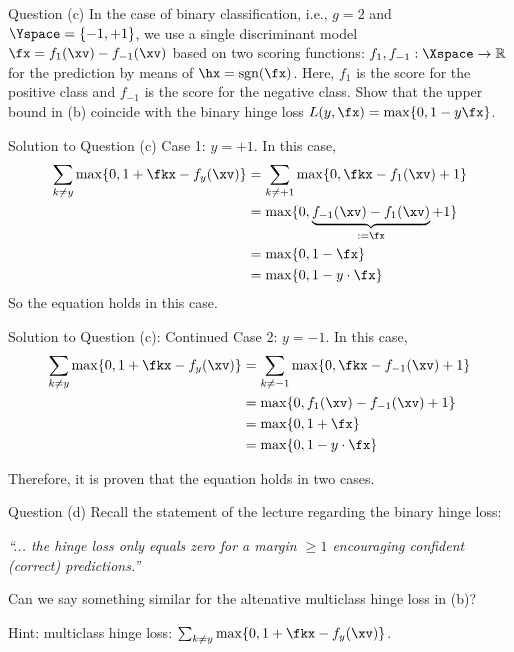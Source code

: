 \documentclass[aspectratio=169]{beamer}
\newcommand{\fyx}{f_y(\xv)}
\begin{document}
\begin{frame}{Question (c)}
	In the case of binary classification, i.e., $g=2$ and $\Yspace = \{-1, +1\}$, we use a single discriminant model $\fx = f_1(\xv) - f_{-1}(\xv)$ based on two scoring functions: $f_1, f_{-1}: \Xspace \to \mathbb{R}$ for the prediction by means of $\hx = \mathrm{sgn}(\fx)$. Here, $f_1$ is the score for the positive class and $f_{-1}$ is the score for the negative class. Show that the upper bound in (b) coincide with the binary hinge loss $L(y, \fx) = \max \{0, 1 - y \fx \}$.
\end{frame}

\begin{frame}{Solution to Question (c)}
	Case 1: $y= + 1$. In this case,
	\begin{align*}
		\sum_{k \neq y} \max \{0, 1 + \fkx - \fyx\}
		&= \sum_{k \neq + 1} \max \{ 0, \fkx - f_1(\xv) + 1 \} \\
		&= \max \{ 0, \underbrace{f_{-1}(\xv) - f_1(\xv)}_{:= \fx} + 1 \} \\
		&= \max \{ 0, 1 - \fx \} \\
		&= \max \{ 0, 1 - y \cdot \fx \}
	\end{align*}
	So the equation holds in this case.
\end{frame}

\begin{frame}{Solution to Question (c): Continued}
	Case 2: $y = -1$. In this case,
	\begin{align*}
		\sum_{k \neq y} \max \{0, 1 + \fkx - \fyx \}
		&= \sum_{k \neq -1} \max \{ 0, \fkx - f_{-1}(\xv) + 1 \} \\
		&= \max \{ 0, f_1(\xv) - f_{-1}(\xv) + 1 \} \\
		&= \max \{0, 1 + \fx \} \\
		&= \max \{0, 1 - y\cdot \fx \}
	\end{align*}
	
Therefore, it is proven that the equation holds in two cases.
\end{frame}

\begin{frame}{Question (d)}
	Recall the statement of the lecture regarding the binary hinge loss:
	\vspace{10pt}
	
	\emph{``... the hinge loss only equals zero for a margin $\geq 1$ encouraging confident (correct) predictions.''}
	\vspace{10pt}
	
	Can we say something similar for the altenative multiclass hinge loss in (b)?
	
	Hint: multiclass hinge loss: $\sum_{k\neq y} \max \{0, 1 + \fkx - f_y(\xv) \}$.
\end{frame}
\end{document}
